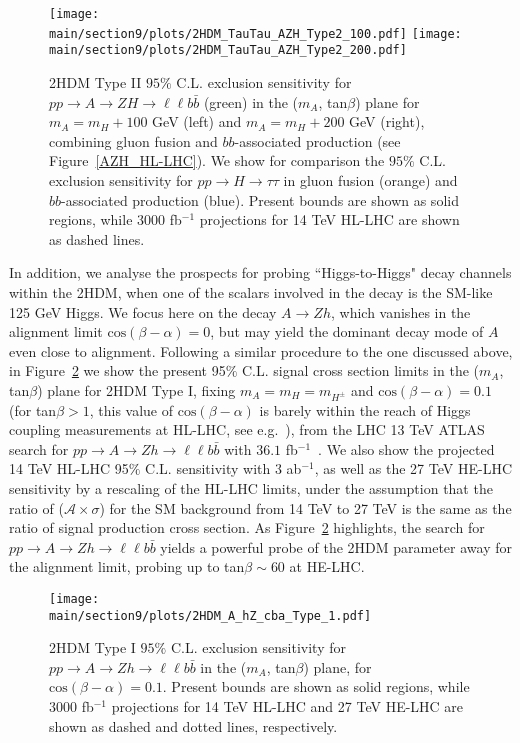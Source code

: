 \begin{figure}[h!]
\begin{center}
\texttt{[image: \\main/section9/plots/2HDM\_TauTau\_AZH\_Type2\_100.pdf]}
\hspace{3mm}
\texttt{[image: \\main/section9/plots/2HDM\_TauTau\_AZH\_Type2\_200.pdf]}
\caption{\small 2HDM Type II $95\%$ C.L. exclusion sensitivity for $p p \to A \to Z H \to \ell\ell b \bar{b}$  (green)
in the ($m_{A}$, tan$\beta$) plane for $m_A = m_H +100$ GeV (left) and $m_A = m_H +200$ GeV (right), combining 
gluon fusion and $bb$-associated production (see Figure~\ref{AZH_HL-LHC}). We show for comparison
the $95\%$ C.L. exclusion sensitivity for $p p \to H \to \tau\tau$ in gluon fusion (orange) 
and $bb$-associated production (blue). Present bounds are shown as solid regions, while $3000$ fb$^{-1}$ projections for 14 TeV HL-LHC are shown as dashed lines.}
\label{TauTau_AZH_HL-HE}
\end{center}
\end{figure}

In addition, we analyse the prospects for probing ``Higgs-to-Higgs" decay channels within the 2HDM, when one of the scalars involved in the decay is the SM-like 125 GeV Higgs. We focus here on the decay $A \to Z h$, which vanishes in the alignment limit $\mathrm{cos}(\beta - \alpha) = 0$, but may yield the dominant decay mode of $A$ even close to alignment. Following a similar procedure to the one discussed above, in Figure~\ref{A_hZ_HL-HE} we show the present 95$\%$ C.L. signal cross section limits in the ($m_{A}$, tan$\beta$) plane for 2HDM Type I, fixing $m_A = m_H = m_{H^{\pm}}$ and $\mathrm{cos}(\beta-\alpha) = 0.1$ (for tan$\beta > 1$, this value of $\mathrm{cos}(\beta-\alpha)$ is barely within the reach of Higgs coupling measurements at HL-LHC, see e.g.~\cite{ATL-PHYS-PUB-2014-017}), from the LHC 13 TeV ATLAS search for $p p \to A \to Z h \to \ell\ell b \bar{b}$ with $36.1$ fb$^{-1}$~\cite{Aaboud:2017cxo}. We also show the projected 14 TeV HL-LHC 95$\%$ C.L. sensitivity with $3$ ab$^{-1}$, as well as the 27 TeV HE-LHC sensitivity by a rescaling of the HL-LHC limits, under the assumption that the ratio of ($\mathcal{A} \times \sigma$) for the SM background from 14 TeV to 27 TeV is the same as the ratio of signal production cross section.
As Figure~\ref{A_hZ_HL-HE} highlights, the search for $p p \to A \to Z h \to \ell\ell b \bar{b}$ yields a powerful probe of the 2HDM parameter away for the alignment limit, probing up to tan$\beta \sim 60$ at HE-LHC.

\begin{figure}[h!]
\begin{center}
\texttt{[image: \\main/section9/plots/2HDM\_A\_hZ\_cba\_Type\_1.pdf]}
\caption{\small 2HDM Type I $95\%$ C.L. exclusion sensitivity for $p p \to A \to Z h \to \ell\ell b \bar{b}$ 
in the ($m_{A}$, tan$\beta$) plane, for $\mathrm{cos}(\beta-\alpha) = 0.1$. 
Present bounds are shown as solid regions, while $3000$ fb$^{-1}$ projections for 14 TeV HL-LHC and 27 TeV HE-LHC
are shown as dashed and dotted lines, respectively.}
\label{A_hZ_HL-HE}
\end{center}
\end{figure}


